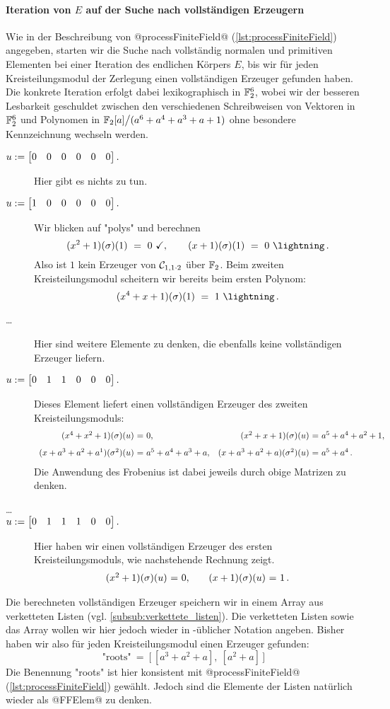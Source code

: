 \paragraph{Iteration von $E$ auf der Suche nach vollständigen Erzeugern}
Wie in der Beschreibung von @processFiniteField@
(\autoref{lst:processFiniteField}) angegeben, starten wir die Suche nach
vollständig normalen und primitiven Elementen bei einer Iteration des endlichen
Körpers $E$, bis wir für jeden Kreisteilungsmodul der Zerlegung einen
vollständigen Erzeuger gefunden haben. Die konkrete Iteration erfolgt dabei
lexikographisch in $\F_2^6$, wobei wir der besseren Lesbarkeit geschuldet
zwischen den verschiedenen Schreibweisen von Vektoren in $\F_2^6$ und
Polynomen in $\F_2[a]\big/(a^6 + a^4 + a^3 + a + 1)$ ohne besondere
Kennzeichnung wechseln werden.
\begin{description}
  \item[$u := \vec{0&0&0&0&0&0}.$] Hier gibt es nichts zu tun.
  \item[$u := \vec{1&0&0&0&0&0}.$] Wir blicken auf "polys" und berechnen
    \[ (x^2+1)(\sigma)(1) \speq= 0\ \checkmark,
    \qquad (x+1)(\sigma)(1) \speq= 0\ \lightning\,.\]
    Also ist $1$ kein Erzeuger von $\C_{1,1\cdot 2}$ über $\F_2$.
    Beim zweiten Kreisteilungsmodul scheitern wir bereits beim ersten Polynom:
    \[ (x^4+x+1)(\sigma)(1) \speq= 1\ \lightning\,.\]
  \item[\ldots] Hier sind weitere Elemente zu denken, die ebenfalls keine 
    vollständigen Erzeuger liefern.
  \item[$u := \vec{0&1&1&0&0&0}.$] Dieses Element liefert einen vollständigen
    Erzeuger des zweiten Kreisteilungsmoduls:
    \[\begin{array}{r@{\ =\ }l@{\quad}r@{\ =\ }l} 
      (x^4+x^2+1)(\sigma)(u) & 0, &
      (x^2+x+1)(\sigma)(u) & a^5+a^4+a^2+1, \\[8pt]
      (x+a^3+a^2+a^1)(\sigma^2)(u) & a^5 + a^4 + a^3 + a, &
      (x+a^3+a^2+a)(\sigma^2)(u) & a^5+a^4\,.
      \end{array}\]
    Die Anwendung des Frobenius ist dabei jeweils durch obige Matrizen zu
    denken.
  \item[\ldots]
  \item[$u := \vec{0&1&1&1&0&0}.$] Hier haben wir einen vollständigen Erzeuger
    des ersten Kreisteilungsmoduls, wie nachstehende Rechnung zeigt.
    \[\begin{array}{r@{\ =\ }l@{\qquad}r@{\ =\ }l} 
      (x^2+1)(\sigma)(u) & 0, &
      (x+1)(\sigma)(u) & 1\,.
      \end{array}\]
\end{description}
Die berechneten vollständigen Erzeuger speichern wir in einem Array aus
verketteten Listen (vgl. \autoref{subsub:verkettete_listen}). Die verketteten
Listen sowie das Array wollen wir hier jedoch wieder in \python-üblicher 
Notation angeben. Bisher haben wir also für jeden Kreisteilungsmodul einen
Erzeuger gefunden:
\[ \text{"roots"}\ =\ \big[\, [a^3+a^2+a],\ [a^2+a] \,\big]\]
Die Benennung "roots" ist hier konsistent mit @processFiniteField@
(\autoref{lst:processFiniteField}) gewählt. Jedoch sind die Elemente der Listen
natürlich wieder als @FFElem@ zu denken.


